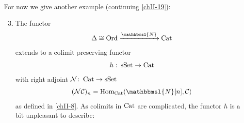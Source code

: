         For now we give another example (continuing \ref{chII-19}):
        \begin{enumerate}[label=\roman*)]
            \setcounter{enumi}{2}
            \item 
                The functor
                \begin{equation*}
                    \Delta \cong \Ord \xrightarrow{\mathbbmsl{N}} \Cat
                \end{equation*}
                extends to a colimit preserving functor
                \begin{equation*}
                    h \,\colon \operatorname{sSet} \to \operatorname{Cat}
                \end{equation*}
                with right adjoint $\mathcal{N} \colon \operatorname{Cat} \to \operatorname{sSet}$
                \begin{equation*}
                    (\Nn\Cc)_n = \Hom_{\Cat}(\mathbbmsl{N}[n], \Cc)
                \end{equation*}
                    as defined in \ref{chII-8}. As colimits in $\operatorname{Cat}$ are complicated, the functor $h$ is a bit unpleasant to describe:
        \end{enumerate}
